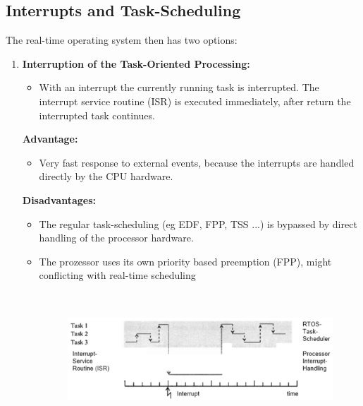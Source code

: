 \os{\newpage}
\subsection{Interrupts and Task-Scheduling}


The real-time operating system then has two options:

\begin{enumerate}
\item {\rot\bf Interruption of the Task-Oriented Processing: }

\begin{itemize}
	\item With an interrupt the currently running task is interrupted. The interrupt service routine (ISR) is executed immediately, after return the interrupted task continues.
\end{itemize}

\textbf{Advantage: } 

\begin{itemize}
	\item Very fast response to external events, because the interrupts are handled directly   by the CPU hardware.
\end{itemize} 

\textbf{Disadvantages: }

\begin{itemize}

\item The regular task-scheduling (eg EDF, FPP, TSS ...) is bypassed by direct handling   of the processor hardware.

\item The prozessor uses its own priority based preemption (FPP), might conflicting with real-time scheduling

 	\begin{figure}[h]
    \centering
    \includegraphics[width=14cm, height=5cm]{Images/image22.png}
    \label{fig:Fig 76}
    \end{figure}


\end{itemize}
\end{enumerate}
